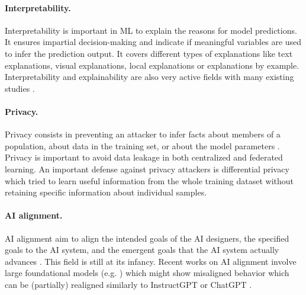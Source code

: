 \paragraph{Interpretability.} Interpretability is important in ML to explain the reasons for model predictions. It ensures impartial decision-making and indicate if meaningful variables are used to infer the prediction output. It covers different types of explanations like text explanations, visual explanations, local explanations or explanations by example. Interpretability and explainability are also very active fields with many existing studies \cite{arrieta2019explainable, overview-interpretable-ml}.

\paragraph{Privacy.} Privacy consists in preventing an attacker to infer facts about members of a population, about data in the training set, or about the model parameters \cite{cristofaro2020privacy, cristofaro2021privacy}. Privacy is important to avoid data leakage in both centralized and federated learning. An important defense against privacy attackers is differential privacy \cite{buglesi2006privacy} which tried to learn useful information from the whole training dataset without retaining specific information about individual samples.


\paragraph{AI alignment.} AI alignment aim to align the intended goals of the AI designers,  the specified goals to the AI system, and the emergent goals that the AI system actually advances \cite{bostrom2014superintelligence, gabriel2020AI}. This field is still at its infancy. Recent works on AI alignment involve large foundational models (e.g. \cite{gpt, rombach2021highresolution, galactica}) which might show misaligned behavior which can be (partially) realigned similarly to InstructGPT \cite{instructgpt} or ChatGPT \cite{chatgpt}.

